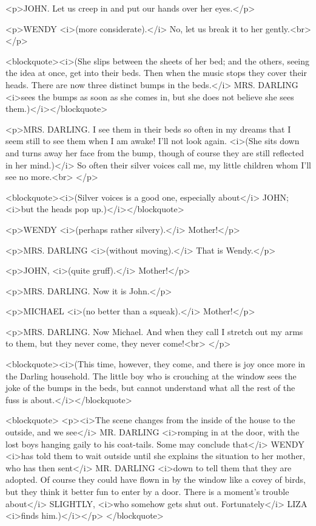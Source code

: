 <p>JOHN. Let us creep in and put our hands over her eyes.</p>

<p>WENDY <i>(more considerate).</i> No, let us break it to her
gently.<br>
</p>

<blockquote><i>(She slips between the sheets of her bed; and the
others, seeing the idea at once, get into their beds. Then when the
music stops they cover their heads. There are now three distinct
bumps in the beds.</i> MRS. DARLING <i>sees the bumps as soon as she
comes in, but she does not believe she sees them.)</i></blockquote>

<p>MRS. DARLING. I see them in their beds so often in my dreams that
I seem still to see them when I am awake! I'll not look again.
<i>(She sits down and turns away her face from the bump, though of
course they are still reflected in her mind.)</i> So often their
silver voices call me, my little children whom I'll see no more.<br>
</p>

<blockquote><i>(Silver voices is a good one, especially about</i>
JOHN; <i>but the heads pop up.)</i></blockquote>

<p>WENDY <i>(perhaps rather silvery).</i> Mother!</p>

<p>MRS. DARLING <i>(without moving).</i> That is Wendy.</p>

<p>JOHN, <i>(quite gruff).</i> Mother!</p>

<p>MRS. DARLING. Now it is John.</p>

<p>MICHAEL <i>(no better than a squeak).</i> Mother!</p>

<p>MRS. DARLING. Now Michael. And when they call I stretch out my
arms to them, but they never come, they never come!<br>
</p>

<blockquote><i>(This time, however, they come, and there is joy once
more in the Darling household. The little boy who is crouching at the
window sees the joke of the bumps in the beds, but cannot understand
what all the rest of the fuss is about.</i></blockquote>

<blockquote>
<p><i>The scene changes from the inside of the house to the outside,
and we see</i> MR. DARLING <i>romping in at the door, with the lost
boys hanging gaily to his coat-tails. Some may conclude that</i>
WENDY <i>has told them to wait outside until she explains the
situation to her mother, who has then sent</i> MR. DARLING <i>down to
tell them that they are adopted. Of course they could have flown in
by the window like a covey of birds, but they think it better fun to
enter by a door. There is a moment's trouble about</i> SLIGHTLY,
<i>who somehow gets shut out. Fortunately</i> LIZA <i>finds
him.)</i></p>
</blockquote>

